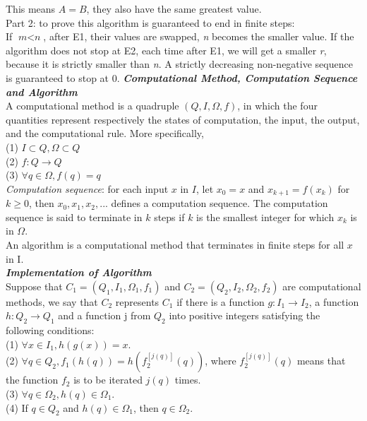 \documentclass[11pt]{article}
\begin{document}
This means $A = B$, they also have the same greatest value.\\
Part 2: to prove this algorithm is guaranteed to end in finite steps:\\
If $\textit{m} < \textit{n}$, after E1, their values are swapped, \textit{n} becomes the smaller value. If the algorithm does not stop at E2, each time after E1, we will get a smaller \textit{r}, because it is strictly smaller than \textit{n}. A strictly decreasing non-negative sequence is guaranteed to stop at 0.\blacksquare
\pagebreak
\textbf{\textit{Computational Method, Computation Sequence and Algorithm}}\\
A computational method is a quadruple $(Q, I, \Omega, f)$, in which the four quantities represent respectively the states of computation, the input, the output, and the computational rule. More specifically,\\
(1) $I \subset Q, \Omega \subset Q$ \\
(2) $f: Q \rightarrow Q$\\
(3) $\forall q \in \Omega, f(q) = q$\\
\newline
\textit{Computation sequence}: for each input $x$ in $I$, let $x_0 = x$ and $x_{k+1} = f(x_k)$ for $k \geqslant 0$, then $x_0, x_1, x_2, ...$ defines a computation sequence.
The computation sequence is said to terminate in $k$ steps if $k$ is the smallest integer for which $x_k$ is in $\Omega$.\\
\newline
An algorithm is a computational method that terminates in finite steps for all $x$ in I.\\

\textbf{\textit{Implementation of Algorithm}}\\
Suppose that $C_1 = (Q_1, I_1, \Omega_1, f_1)$ and $C_2 = (Q_2, I_2, \Omega_2, f_2)$ are computational methods, we say that $C_2$ represents $C_1$ if there is a function $g: I_1\rightarrow I_2$, a function $h: Q_2 \rightarrow Q_1$ and a function j from $Q_2$ into positive integers satisfying the following conditions:\\
(1) $\forall x \in I_1, h(g(x)) = x$.\\
(2) $\forall q \in Q_2, f_1(h(q)) = h(f_2^{[j(q)]}(q))$, where $f_2^{[j(q)]}(q)$ means that the function $f_2$ is to be iterated $j(q)$ times.\\
(3) $\forall q \in \Omega_2, h(q) \in \Omega_1$.\\
(4) If $q \in Q_2$ and $h(q) \in \Omega_1$, then $q \in \Omega_2$.\\
\end{document}
